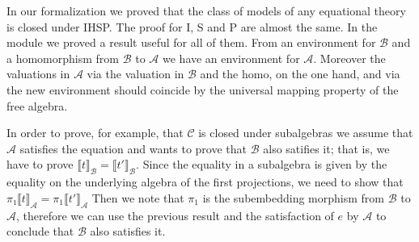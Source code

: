 In our formalization we proved that the class of models of any
equational theory is closed under IHSP. The proof for I, S and P are
almost the same. In the module  we proved a result
useful for all of them. From an environment for $\mathcal{B}$ and a
homomorphism from $\mathcal{B}$ to $\mathcal{A}$ we have an
environment for $\mathcal{A}$. Moreover the valuations in
$\mathcal{A}$ via the valuation in $\mathcal{B}$ and the homo, on the
one hand, and via the new environment should coincide by the universal
mapping property of the free algebra.

\newcommand{\sem}[2]{\llbracket #1 \rrbracket_{\mathcal{#2}}} In order
to prove, for example, that $\mathcal{C}$ is closed under subalgebras
we assume that $\mathcal{A}$ satisfies the equation and wants to prove
that $\mathcal{B}$ also satifies it; that is, we have to prove
$\sem{t}{B} = \sem{t'}{B}$. Since the equality in a subalgebra is
given by the equality on the underlying algebra of the first
projections, we need to show that $\pi₁ \sem{t}{A} = \pi_1\sem{t'}{A}$
Then we note that $\pi_1$ is the subembedding morphism from $\mathcal{B}$ to
$\mathcal{A}$, therefore we can use the previous result and the satisfaction
of $e$ by $\mathcal{A}$ to conclude that $\mathcal{B}$ also satisfies it.

